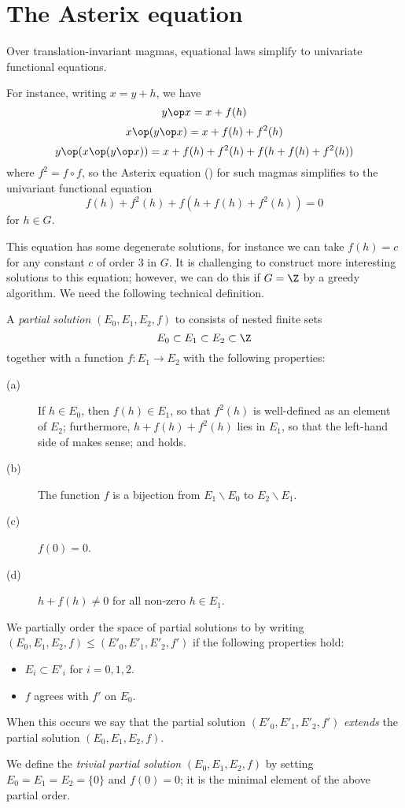 \section{The Asterix equation}\label{asterix-section}

Over translation-invariant magmas, equational laws simplify to univariate functional equations.

For instance, writing $x = y+h$, we have
$$ y \op x = x + f(h)$$
$$ x \op (y \op x) = x + f(h) + f^2(h)$$
$$ y \op (x \op (y \op x)) = x + f(h) + f^2(h) + f( h + f(h) + f^2(h) )$$
where $f^2 = f \circ f$, so the Asterix equation () for such magmas simplifies to the univariant functional equation
\begin{equation}\label{fh}
   f(h) + f^2(h) + f( h + f(h) + f^2(h) ) = 0
\end{equation}
for $h \in G$.

This equation has some degenerate solutions, for instance we can take $f(h) = c$ for any constant $c$ of order $3$ in $G$.  It is challenging to construct more interesting solutions to this equation; however, we can do this if $G=\Z$ by a greedy algorithm.  We need the following technical definition.

\begin{definition}\label{partial-solution}  A \emph{partial solution} $(E_0, E_1, E_2, f)$ to  consists of nested finite sets
$$ E_0 \subset E_1 \subset E_2 \subset \Z$$ together with a function $f: E_1 \to E_2$ with the following properties:
\begin{description}
  \item[(a)] If $h \in E_0$, then $f(h) \in E_1$, so that $f^2(h)$ is well-defined as an element of $E_2$; furthermore, $h + f(h) + f^2(h)$ lies in $E_1$, so that the left-hand side of  makes sense; and  holds.
  \item[(b)] The function $f$ is a bijection from $E_1 \backslash E_0$ to $E_2 \backslash E_1$.
  \item[(c)] $f(0)=0$.
  \item[(d)] $h+f(h) \neq 0$ for all non-zero $h \in E_1$.
\end{description}

We partially order the space of partial solutions to  by writing $(E_0, E_1, E_2, f) \leq (E'_0, E'_1, E'_2, f')$ if the following properties hold:
\begin{itemize}
  \item $E_i \subset E'_i$ for $i=0,1,2$.
  \item $f$ agrees with $f'$ on $E_0$.
\end{itemize}
When this occurs we say that the partial solution $(E'_0, E'_1, E'_2, f')$ \emph{extends} the partial solution $(E_0, E_1, E_2, f)$.

We define the \emph{trivial partial solution} $(E_0,E_1,E_2,f)$ by setting $E_0=E_1=E_2=\{0\}$ and $f(0)=0$; it is the minimal element of the above partial order.
\end{definition}


